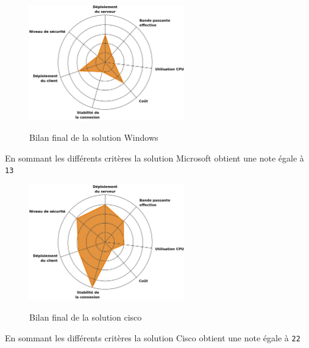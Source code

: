 \begin{figure}[H]
	\begin{center}
		\includegraphics[width=0.6\textwidth]{partie_3/images/windows.png}\\
	\end{center}
	\caption{Bilan final de la solution Windows}
	\label{Graphe Windows}
\end{figure}

En sommant les différents critères la solution Microsoft obtient une note égale à \verb|13|

\begin{figure}[H]
	\begin{center}
		\includegraphics[width=0.6\textwidth]{partie_3/images/cisco.png}\\
	\end{center}
	\caption{Bilan final de la solution cisco}
	\label{Graphe Cisco}
\end{figure}

En sommant les différents critères la solution Cisco obtient une note égale à \verb|22|

